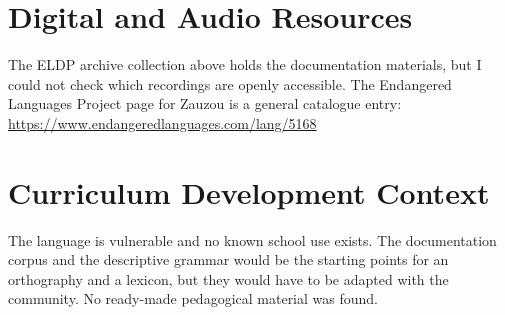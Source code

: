 \documentclass[12pt]{article}
\begin{document}
\section{Digital and Audio Resources}
The ELDP archive collection above holds the documentation materials, but I could not check which recordings are openly accessible. The Endangered Languages Project page for Zauzou is a general catalogue entry: \url{https://www.endangeredlanguages.com/lang/5168}

\section{Curriculum Development Context}
The language is vulnerable and no known school use exists. The documentation corpus and the descriptive grammar would be the starting points for an orthography and a lexicon, but they would have to be adapted with the community. No ready-made pedagogical material was found.
\end{document}
